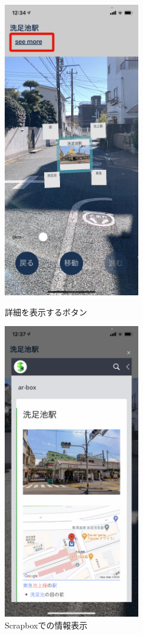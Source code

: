 \begin{figure}[h]
  \begin{minipage}{0.5\hsize}
    \centering
    \includegraphics[width=60mm]{images/hypar_touch_top.png}
    \caption{詳細を表示するボタン} \label{fig:hypar_touch_top}
  \end{minipage}
  \begin{minipage}{0.5\hsize}
    \centering
    \includegraphics[width=60mm]{images/hypar_touch_webview.png}
    \caption{Scrapboxでの情報表示} \label{fig:hypar_touch_webview}
  \end{minipage}
\end{figure}

